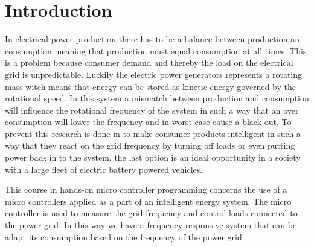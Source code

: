 \chapter{Introduction}
\label{chap:intro}
In electrical power production there has to be a balance between production an consumption meaning that production must equal consumption at all times. This is a problem because consumer demand and thereby the load on the electrical grid is unpredictable. Luckily the electric power generators represents a rotating mass witch means that energy can be stored as kinetic energy governed by the rotational speed. In this system a mismatch between production and consumption will influence the rotational frequency of the system in such a way that an over consumption will lower the frequency and in worst case cause a black out. To prevent this research is done in to make consumer products intelligent in such a way that they react on the grid frequency by turning off loads or even putting power back in to the system, the last option is an ideal opportunity in a society with a large fleet of electric battery powered vehicles.

This course in hands-on micro controller programming concerns the use of a micro controllers applied as a part of an intelligent energy system. The micro controller is used to measure the grid frequency and control loads connected to the power grid. In this way we have a frequency responsive system that can be adapt its consumption based on the frequency of the power grid.
